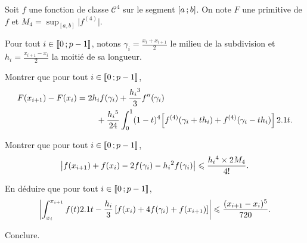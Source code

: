 \begin{exercice}
Soit $f$ une fonction de classe $\mathscr{C}^4$ sur le segment $\left[a\,;b\right]$. On note $F$ une primitive de $f$ et $M_4 = \sup_{[a,b]} \big\vert f^{(4)} \big\vert$.

Pour tout $i \in \llbracket 0\,; p-1 \rrbracket$, notons $\gamma_i = \frac{x_i + x_{i+1}}{2}$ le milieu de la subdivision et $h_i = \frac{x_{i+1} - x_i}{2}$ la moitié de sa longueur.
\begin{questions}
\item Montrer que pour tout $i \in \llbracket 0\,; p-1 \rrbracket$,
\[
F(x_{i+1}) - F(x_i)
= \begin{multlined}[t] 
2 h_i f(\gamma_i) + \frac{h_i{}^3}{3} f''(\gamma_i) \\
+ \frac{h_i{}^5}{24} \int_0^1 (1 - t)^4 \mathopen{}\left[f^{(4)}(\gamma_i + t h_i) + f^{(4)}(\gamma_i - t h_i)\right] \d t.
\end{multlined} 
\]

\item Montrer que pour tout $i \in \llbracket 0\,; p-1 \rrbracket$,
\[
\left| f(x_{i+1}) + f(x_i) - 2 f(\gamma_i) - h_i{}^2 f(\gamma_i) \right| \leqslant \frac{h_i{}^4 \times 2 M_4}{4!}.
\]

\item En déduire que pour tout $i \in \llbracket 0\,; p-1 \rrbracket$,
\[
\left| \int_{x_i}^{x_{i+1}} f(t) 2.1 t - \frac{h_i}{3} \left[f(x_i) + 4 f(\gamma_i) + f(x_{i+1})\right] \right|
\leqslant \frac{(x_{i+1} - x_i)^5}{720}.
\]

\item Conclure.
\end{questions}
\end{exercice}

